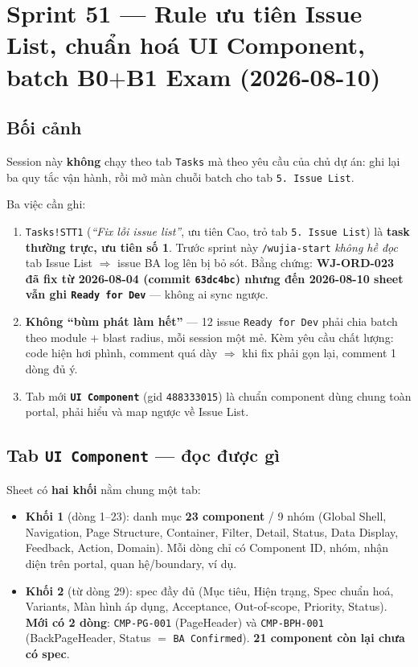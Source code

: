 \chapter{Sprint 51 --- Rule ưu tiên Issue List, chuẩn hoá UI Component, batch B0$+$B1 Exam (2026-08-10)}

\section{Bối cảnh}

Session này \textbf{không} chạy theo tab \texttt{Tasks} mà theo yêu cầu của chủ dự án: ghi lại ba
quy tắc vận hành, rồi mở màn chuỗi batch cho tab \texttt{5. Issue List}.

Ba việc cần ghi:

\begin{enumerate}
  \item \texttt{Tasks!STT1} (\emph{``Fix lỗi issue list''}, ưu tiên Cao, trỏ tab
    \texttt{5. Issue List}) là \textbf{task thường trực, ưu tiên số 1}. Trước sprint này
    \texttt{/wujia-start} \emph{không hề đọc} tab Issue List $\Rightarrow$ issue BA log lên bị bỏ
    sót. Bằng chứng: \textbf{WJ-ORD-023 đã fix từ 2026-08-04 (commit \texttt{63dc4bc}) nhưng đến
    2026-08-10 sheet vẫn ghi \texttt{Ready for Dev}} --- không ai sync ngược.
  \item \textbf{Không ``bùm phát làm hết''} --- 12 issue \texttt{Ready for Dev} phải chia batch
    theo module $+$ blast radius, mỗi session một mẻ. Kèm yêu cầu chất lượng: code hiện hơi
    phình, comment quá dày $\Rightarrow$ khi fix phải gọn lại, comment 1 dòng đủ ý.
  \item Tab mới \textbf{\texttt{UI Component}} (gid \texttt{488333015}) là chuẩn component dùng
    chung toàn portal, phải hiểu và map ngược về Issue List.
\end{enumerate}

\section{Tab \texttt{UI Component} --- đọc được gì}

Sheet có \textbf{hai khối} nằm chung một tab:

\begin{itemize}
  \item \textbf{Khối 1} (dòng 1--23): danh mục \textbf{23 component} / 9 nhóm (Global Shell,
    Navigation, Page Structure, Container, Filter, Detail, Status, Data Display, Feedback,
    Action, Domain). Mỗi dòng chỉ có Component ID, nhóm, nhận diện trên portal, quan hệ/boundary,
    ví dụ.
  \item \textbf{Khối 2} (từ dòng 29): spec đầy đủ (Mục tiêu, Hiện trạng, Spec chuẩn hoá,
    Variants, Màn hình áp dụng, Acceptance, Out-of-scope, Priority, Status). \textbf{Mới có 2
    dòng}: \texttt{CMP-PG-001} (PageHeader) và \texttt{CMP-BPH-001} (BackPageHeader,
    Status $=$ \texttt{BA Confirmed}). \textbf{21 component còn lại chưa có spec}.
\end{itemize}

